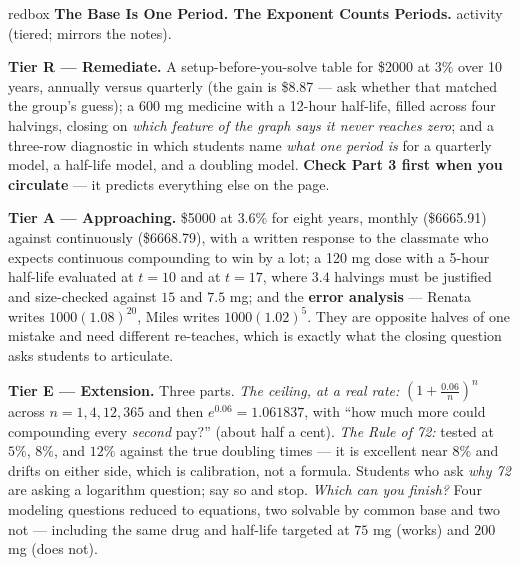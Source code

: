 \documentclass[10pt]{article}
\begin{document}
\begin{skillbox}{redbox}
\textbf{The Base Is One Period. The Exponent Counts Periods.} activity (tiered; mirrors the notes).
\begin{multicols}{3}
\textbf{Tier R --- Remediate.} A setup-before-you-solve table for \$2000 at $3\%$ over 10 years,
annually versus quarterly (the gain is \$8.87 --- ask whether that matched the group's guess); a 600 mg
medicine with a 12-hour half-life, filled across four halvings, closing on \emph{which feature of the
graph says it never reaches zero}; and a three-row diagnostic in which students name \emph{what one
period is} for a quarterly model, a half-life model, and a doubling model. \textbf{Check Part 3 first
when you circulate} --- it predicts everything else on the page.

\columnbreak
\textbf{Tier A --- Approaching.} \$5000 at $3.6\%$ for eight years, monthly (\$6665.91) against
continuously (\$6668.79), with a written response to the classmate who expects continuous compounding to
win by a lot; a 120 mg dose with a 5-hour half-life evaluated at $t=10$ and at $t=17$, where $3.4$
halvings must be justified and size-checked against $15$ and $7.5$ mg; and the \textbf{error analysis}
--- Renata writes $1000(1.08)^{20}$, Miles writes $1000(1.02)^{5}$. They are opposite halves of one
mistake and need different re-teaches, which is exactly what the closing question asks students to
articulate.

\columnbreak
\textbf{Tier E --- Extension.} Three parts. \emph{The ceiling, at a real rate:}
$\left(1+\frac{0.06}{n}\right)^{n}$ across $n=1,4,12,365$ and then $e^{0.06}=1.061837$, with ``how much
more could compounding every \emph{second} pay?'' (about half a cent). \emph{The Rule of 72:} tested at
$5\%$, $8\%$, and $12\%$ against the true doubling times --- it is excellent near $8\%$ and drifts on
either side, which is calibration, not a formula. Students who ask \emph{why 72} are asking a logarithm
question; say so and stop. \emph{Which can you finish?} Four modeling questions reduced to equations,
two solvable by common base and two not --- including the same drug and half-life targeted at $75$ mg
(works) and $200$ mg (does not).
\end{multicols}
\end{skillbox}
\end{document}
